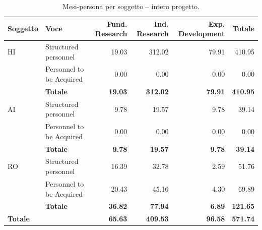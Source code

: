 \documentclass{plan4ari_report}
\begin{document}
\clearpage
\begin{table}[H]\centering\small\caption{Mesi-persona per soggetto -- intero progetto.}\label{tab:wp-s-tot}
\begin{tabular}{llrrrr}\toprule\textbf{Soggetto} & \textbf{Voce} & \textbf{Fund. Research} & \textbf{Ind. Research} & \textbf{Exp. Development} & \textbf{Totale} \\\midrule
HI & Structured personnel & 19.03 & 312.02 & 79.91 & 410.95 \\
 & Personnel to be Acquired & 0.00 & 0.00 & 0.00 & 0.00 \\
 & \textbf{Totale} & \textbf{19.03} & \textbf{312.02} & \textbf{79.91} & \textbf{410.95} \\\midrule
AI & Structured personnel & 9.78 & 19.57 & 9.78 & 39.14 \\
 & Personnel to be Acquired & 0.00 & 0.00 & 0.00 & 0.00 \\
 & \textbf{Totale} & \textbf{9.78} & \textbf{19.57} & \textbf{9.78} & \textbf{39.14} \\\midrule
RO & Structured personnel & 16.39 & 32.78 & 2.59 & 51.76 \\
 & Personnel to be Acquired & 20.43 & 45.16 & 4.30 & 69.89 \\
 & \textbf{Totale} & \textbf{36.82} & \textbf{77.94} & \textbf{6.89} & \textbf{121.65} \\\midrule
\textbf{Totale} & & \textbf{65.63} & \textbf{409.53} & \textbf{96.58} & \textbf{571.74} \\
\bottomrule\end{tabular}\end{table}
\end{document}
